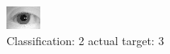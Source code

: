 \begin{figure}[h!]
\begin{center}
\includegraphics[width=0.60\columnwidth]{figures/ID1153_class_2_target_3.png}
\end{center}
\caption{ Classification: 2 actual target: 3}
\label{fig:ID1153_class_2_target_3}
\end{figure}
